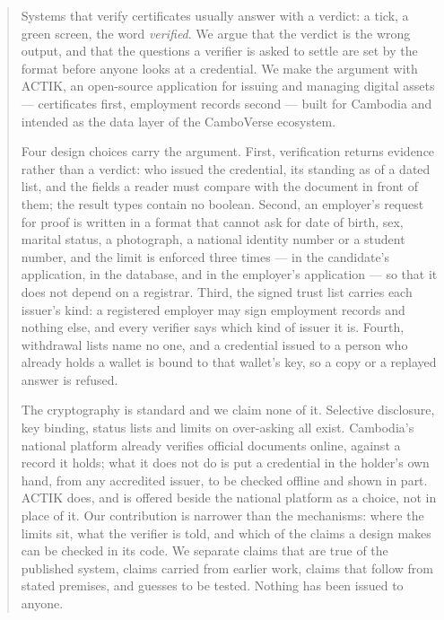 \documentclass[10pt,a4paper,twocolumn]{article}
\begin{document}
\begin{abstract}
\noindent
Systems that verify certificates usually answer with a verdict: a tick, a
green screen, the word \emph{verified}. We argue that the verdict is the wrong
output, and that the questions a verifier is asked to settle are set by the
format before anyone looks at a credential. We make the argument with ACTIK, an
open-source application for issuing and managing digital assets --- certificates
first, employment records second --- built for Cambodia and intended as the data
layer of the CamboVerse ecosystem.

Four design choices carry the argument. First, verification returns evidence
rather than a verdict: who issued the credential, its standing as of a dated
list, and the fields a reader must compare with the document in front of them;
the result types contain no boolean. Second, an employer's request for proof is
written in a format that cannot ask for date of birth, sex, marital status, a
photograph, a national identity number or a student number, and the limit is
enforced three times --- in the candidate's application, in the database, and in
the employer's application --- so that it does not depend on a registrar. Third,
the signed trust list carries each issuer's kind: a registered employer may sign
employment records and nothing else, and every verifier says which kind of
issuer it is. Fourth, withdrawal lists name no one, and a credential issued to a
person who already holds a wallet is bound to that wallet's key, so a copy or a
replayed answer is refused.

The cryptography is standard and we claim none of it. Selective disclosure, key
binding, status lists and limits on over-asking all exist. Cambodia's national
platform already verifies official documents online, against a record it holds;
what it does not do is put a credential in the holder's own hand, from any
accredited issuer, to be checked offline and shown in part. ACTIK does, and is
offered beside the national platform as a choice, not in place of it. Our
contribution is narrower than the mechanisms: where the
limits sit, what the verifier is told, and which of the claims a design makes
can be checked in its code. We separate claims that are true of the published
system, claims carried from earlier work, claims that follow from stated
premises, and guesses to be tested. Nothing has been issued to anyone.
\end{abstract}

\end{document}
